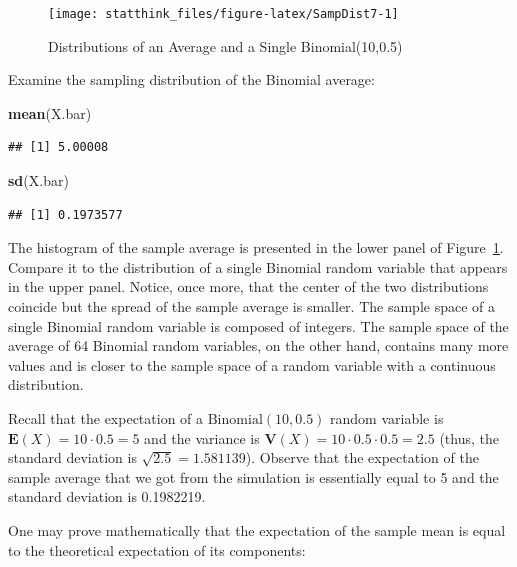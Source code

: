 \documentclass[
]{krantz}
\makeatletter
\newenvironment{Shaded}{\begin{snugshade}}{\end{snugshade}}
\newcommand{\KeywordTok}[1]{\textcolor[rgb]{0.13,0.29,0.53}{\textbf{#1}}}
\newcommand{\NormalTok}[1]{#1}
\newcommand{\Expec}{\mathbf{E}}
\newcommand{\Var}{\mathbf{V}}
\newenvironment{kframe}{%
\medskip{}
\setlength{\fboxsep}{.8em}
 \def\at@end@of@kframe{}%
 \ifinner\ifhmode%
  \def\at@end@of@kframe{\end{minipage}}%
  \begin{minipage}{\columnwidth}%
 \fi\fi%
 \def\FrameCommand##1{\hskip\@totalleftmargin \hskip-\fboxsep
 \colorbox{shadecolor}{##1}\hskip-\fboxsep
     \hskip-\linewidth \hskip-\@totalleftmargin \hskip\columnwidth}%
 \MakeFramed {\advance\hsize-\width
   \@totalleftmargin\z@ \linewidth\hsize
   \@setminipage}}%
 {\par\unskip\endMakeFramed%
 \at@end@of@kframe}
\renewenvironment{Shaded}{\begin{kframe}}{\end{kframe}}
\theoremstyle{definition}
\theoremstyle{definition}
\theoremstyle{definition}
\theoremstyle{remark}
\makeatother
\begin{document}
\begin{figure}

{\centering \texttt{[image: statthink\_files/figure-latex/SampDist7-1]} 

}

\caption{Distributions of an Average and a Single Binomial(10,0.5)}\label{fig:SampDist7}
\end{figure}

Examine the sampling distribution of the Binomial average:

\begin{Shaded}
\begin{Highlighting}[]
\KeywordTok{mean}\NormalTok{(X.bar)}
\end{Highlighting}
\end{Shaded}

\begin{verbatim}
## [1] 5.00008
\end{verbatim}

\begin{Shaded}
\begin{Highlighting}[]
\KeywordTok{sd}\NormalTok{(X.bar)}
\end{Highlighting}
\end{Shaded}

\begin{verbatim}
## [1] 0.1973577
\end{verbatim}

The histogram of the sample average is presented in the lower panel of
Figure~\ref{fig:SampDist7}. Compare it to the distribution of a single
Binomial random variable that appears in the upper panel. Notice, once
more, that the center of the two distributions coincide but the spread
of the sample average is smaller. The sample space of a single Binomial
random variable is composed of integers. The sample space of the average
of 64 Binomial random variables, on the other hand, contains many more
values and is closer to the sample space of a random variable with a
continuous distribution.

Recall that the expectation of a \(\mathrm{Binomial}(10,0.5)\) random
variable is \(\Expec(X) = 10 \cdot 0.5 = 5\) and the variance is
\(\Var(X) = 10 \cdot 0.5 \cdot 0.5 = 2.5\) (thus, the standard deviation
is \(\sqrt{2.5} = 1.581139\)). Observe that the expectation of the sample
average that we got from the simulation is essentially equal to 5 and
the standard deviation is 0.1982219.

One may prove mathematically that the expectation of the sample mean is
equal to the theoretical expectation of its components:
\end{document}
